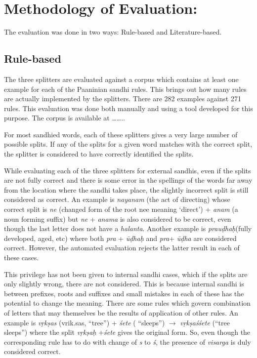 \documentclass[11pt]{article}
\begin{document}
\section{Methodology of Evaluation:}
\label{sect:methodology}

The evaluation was done in two ways: Rule-based and Literature-based. 


\subsection{Rule-based}
The three splitters are evaluated against a corpus which contains at least one example for each of the Paaninian sandhi rules. This brings out how many rules are actually implemented by the splitters. There are 282 examples against 271 rules. This evaluation was done both manually and using a tool developed for this purpose. The corpus is available at ……..

For most sandhied words, each of these splitters gives a very large number of possible splits. If any of the splits for a given word matches with the correct split, the splitter is considered to have correctly identified the splits. 

While evaluating each of the three splitters for external sandhis, even if the splits are not fully correct and there is some error in the spellings of the words far away from the location where the sandhi takes place, the slightly incorrect split is still considered as correct. An example is \textit{nayanam} (the act of directing)  whose correct split is \textit{ne} (changed form of the root nee meaning ‘direct’) + \textit{anam} (a noun forming suffix)  but \textit{ne}  + \textit{anama} is also considered to be correct, even though the last letter does not have a \textit{halanta}.  Another example is \textit{prauḍhaḥ}(fully developed, aged, etc) where both \textit{pra} + \textit{ūḍhaḥ}  and \textit{pra}+ \textit{ūḍha} are considered correct.  However, the automated evaluation rejects the latter result in each of these cases.


This privilege has not been given to internal sandhi cases, which if the splits are only slightly wrong, there are not considered.  This is because internal sandhi is between prefixes, roots and suffixes and small mistakes in each of these has the potential to change the meaning.
There are some rules which govern combination of letters that may themselves be the results of application of other rules. An example is \textit{vṛkṣas }(vrik.sas, “tree”) + \textit{śete} ( ``sleeps'') $\rightarrow$ \textit{vṛkṣaśśete} (``tree sleeps'') where the split \textit{vṛkṣaḥ } +\textit{śete}  gives the original form. So, even though the corresponding rule has to do with change of \textit{s} to\textit{ ś}, the presence of \textit{visarga} is duly considered correct.
\end{document}
